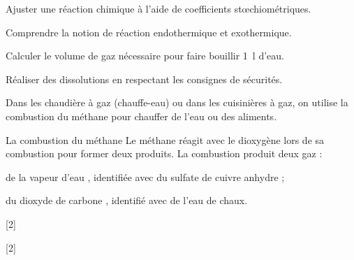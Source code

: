 \teteSndChim


\begin{objectifs}
  \item Ajuster une réaction chimique à l'aide de coefficients stœchiométriques.
  \item Comprendre la notion de réaction endothermique et exothermique. 
  \item Calculer le volume de gaz nécessaire pour faire bouillir \qty{1}{\litre} d'eau.
  \item Réaliser des dissolutions en respectant les consignes de sécurités.
\end{objectifs}

\begin{contexte}
  Dans les chaudière à gaz (chauffe-eau) ou dans les cuisinières à gaz, on utilise la combustion du méthane pour chauffer de l'eau ou des aliments.
  
\end{contexte}


\begin{doc}{La combustion du méthane}
  Le méthane \methane réagit avec le dioxygène \dioxygene lors de sa combustion pour former deux produits.
  La combustion produit deux gaz :
  \begin{listePoints}
    \item de la vapeur d'eau , identifiée avec du sulfate de cuivre anhydre ;
    \item du dioxyde de carbone \dioxydeDeCarbone, identifié avec de l'eau de chaux.
  \end{listePoints}
\end{doc}


[2]

[2]


